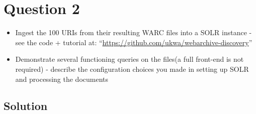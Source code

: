 
\section{Question 2}
\label{part2}
\begin{itemize} 
\item Ingest the 100 URIs from their resulting WARC files into a SOLR instance
	   - see the code + tutorial at:
	    ``\url{https://github.com/ukwa/webarchive-discovery}''

\item Demonstrate several functioning queries on the files(a full front-end is not required)
	  - describe the configuration choices you made in setting up SOLR and processing the 
	  	documents
\end{itemize}

\subsection{Solution}


